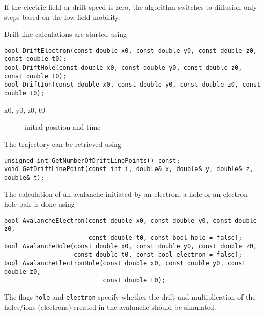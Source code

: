 If the electric field or drift speed is zero, the algorithm switches 
to diffusion-only steps based on the low-field mobility.

Drift line calculations are started using 
\begin{lstlisting}
bool DriftElectron(const double x0, const double y0, const double z0, const double t0);
bool DriftHole(const double x0, const double y0, const double z0, const double t0);
bool DriftIon(const double x0, const double y0, const double z0, const double t0);
\end{lstlisting}
\begin{description}
  \item[x0, y0, z0, t0] initial position and time
\end{description}
The trajectory can be retrieved using
\begin{lstlisting} 
unsigned int GetNumberOfDriftLinePoints() const;
void GetDriftLinePoint(const int i, double& x, double& y, double& z, double& t);
\end{lstlisting}

The calculation of an avalanche initiated by an electron, 
a hole or an electron-hole pair is done using
\begin{lstlisting}
bool AvalancheElectron(const double x0, const double y0, const double z0,
                       const double t0, const bool hole = false);
bool AvalancheHole(const double x0, const double y0, const double z0,
                   const double t0, const bool electron = false);
bool AvalancheElectronHole(const double x0, const double y0, const double z0, 
                           const double t0);
\end{lstlisting}
The flags \texttt{hole} and \texttt{electron} specify whether the  
drift and multiplication of the holes/ions (electrons) created in the 
avalanche should be simulated. 

